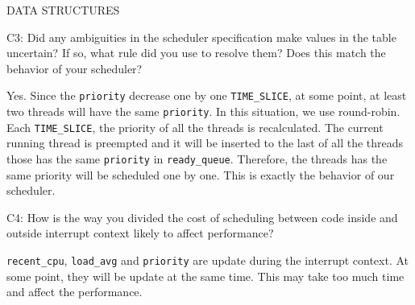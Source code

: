 \begin{aspect}{DATA STRUCTURES}
  \begin{qc}
    C3: Did any ambiguities in the scheduler specification make values in the table uncertain?  If so, what rule did you use to resolve them?  Does this match the behavior of your scheduler?
  \end{qc}
  Yes. Since the \lstinline{priority} decrease one by one \lstinline{TIME_SLICE}, at some point, at least two threads will have the same \lstinline{priority}. In this situation, we use round-robin. Each \lstinline{TIME_SLICE}, the priority of all the threads is recalculated. The current running thread is preempted and it will be inserted to the last of all the threads those has the same \lstinline{priority} in \lstinline{ready_queue}. Therefore, the threads has the same priority will be scheduled one by one. This is exactly the behavior of our scheduler.
  \begin{qc}
    C4: How is the way you divided the cost of scheduling between code inside and outside interrupt context likely to affect performance?
  \end{qc}
  \lstinline{recent_cpu}, \lstinline{load_avg} and \lstinline{priority} are update during the interrupt context. At some point, they will be update at the same time. This may take too much time and affect the performance.


\end{aspect}

